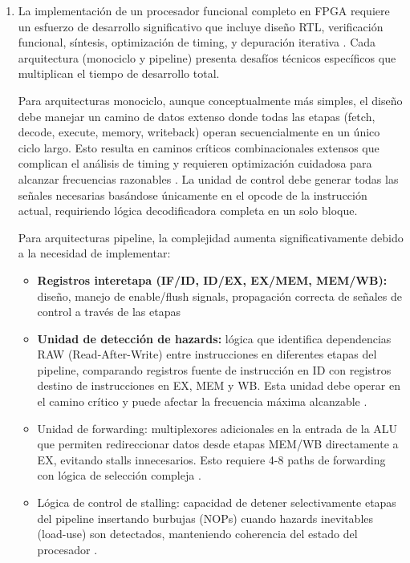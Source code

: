 \begin{enumerate}
    \item La implementación de un procesador funcional completo en FPGA requiere un esfuerzo de desarrollo significativo que incluye diseño RTL, verificación funcional, síntesis, optimización de timing, y depuración iterativa \parencite{Chu2011FPGA}. Cada arquitectura (monociclo y pipeline) presenta desafíos técnicos específicos que multiplican el tiempo de desarrollo total.
    
    Para arquitecturas monociclo, aunque conceptualmente más simples, el diseño debe manejar un camino de datos extenso donde todas las etapas (fetch, decode, execute, memory, writeback) operan secuencialmente en un único ciclo largo. Esto resulta en caminos críticos combinacionales extensos que complican el análisis de timing y requieren optimización cuidadosa para alcanzar frecuencias razonables \parencite{Harris2021Digital}. La unidad de control debe generar todas las señales necesarias basándose únicamente en el opcode de la instrucción actual, requiriendo lógica decodificadora completa en un solo bloque.

    Para arquitecturas pipeline, la complejidad aumenta significativamente debido a la necesidad de implementar:

        \begin{itemize}
            \item \textbf{Registros interetapa (IF/ID, ID/EX, EX/MEM, MEM/WB):} diseño, manejo de enable/flush signals, propagación correcta de señales de control a través de las etapas \parencite{Harris2021Digital}
            \item \textbf{Unidad de detección de hazards:} lógica que identifica dependencias RAW (Read-After-Write) entre instrucciones en diferentes etapas del pipeline, comparando registros fuente de instrucción en ID con registros destino de instrucciones en EX, MEM y WB. Esta unidad debe operar en el camino crítico y puede afectar la frecuencia máxima alcanzable \parencite{Patterson2017Computer}.
            \item Unidad de forwarding: multiplexores adicionales en la entrada de la ALU que permiten redireccionar datos desde etapas MEM/WB directamente a EX, evitando stalls innecesarios. Esto requiere 4-8 paths de forwarding con lógica de selección compleja \parencite{Mnaaoui2018Pipeline}.

            \item Lógica de control de stalling: capacidad de detener selectivamente etapas del pipeline insertando burbujas (NOPs) cuando hazards inevitables (load-use) son detectados, manteniendo coherencia del estado del procesador \parencite{Patterson2017Computer}.


\end{itemize}
\end{enumerate}
